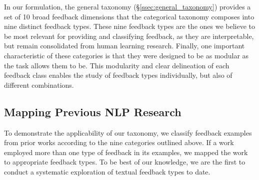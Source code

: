 In our formulation, the general taxonomy (\S\ref{ssec:general_taxonomy}) provides a set of 10 broad feedback dimensions that the categorical taxonomy composes into nine distinct feedback types.
These nine feedback types are the ones we believe to be most relevant for providing and classifying feedback, as they are interpretable, but remain consolidated from human learning research. 
%
Finally, one important characteristic of these categories is that they were designed to be as modular as the task allows them to be. 
This modularity and clear delineation of each feedback class enables the study of feedback types individually, but also of different combinations. 

\subsection{Mapping Previous NLP Research}

To demonstrate the applicability of our taxonomy, we classify feedback examples from prior works according to the nine categories outlined above. If a work employed more than one type of feedback in its examples, we mapped the work to appropriate feedback types.
To be best of our knowledge, we are the first to conduct a systematic exploration of textual feedback types to date.


